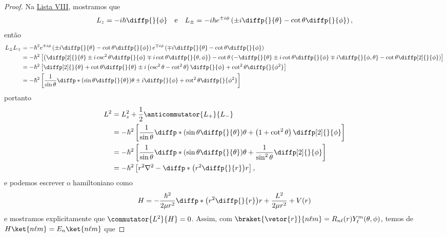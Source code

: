 \begin{proof}
    Na \href{https://github.com/louisradial/4302403-mecanica-quantica-i/releases/tag/lista8}{Lista VIII}, mostramos que
    \begin{equation*}
        L_z = -i\hbar \diffp{}{\phi}\quad\text{e}\quad L_{\pm} = -i\hbar e^{\pm i \phi}\left(\pm i \diffp{}{\theta} - \cot\theta \diffp{}{\phi}\right),
    \end{equation*}
    então
    \begin{align*}
        L_\pm L_\mp &= -\hbar^2 e^{\pm i \phi}\left(\pm i \diffp{}{\theta} - \cot\theta \diffp{}{\phi}\right)e^{\mp i \phi}\left(\mp i \diffp{}{\theta} - \cot\theta \diffp{}{\phi}\right)\\
                    &= -\hbar^2 \left[\left(\diffp[2]{}{\theta} \pm i\csc^2\theta \diffp{}{\phi} \mp i \cot\theta \diffp{}{\theta,\phi}\right) - \cot\theta \left(- \diffp{}{\theta} \pm i \cot\theta \diffp{}{\phi} \mp i \diffp{}{\phi, \theta} - \cot\theta \diffp[2]{}{\phi}\right)\right]\\
                    &= -\hbar^2 \left[\diffp[2]{}{\theta} + \cot\theta \diffp{}{\theta} \pm i \left(\csc^2\theta - \cot^2\theta\right)\diffp{}{\phi} + \cot^2\theta \diffp{}{\phi^2}\right]\\
                    &= -\hbar^2\left[\frac{1}{\sin\theta}\diffp*{\left(\sin\theta\diffp{}{\theta}\right)}{\theta}  \pm i \diffp{}{\phi} + \cot^2\theta \diffp{}{\phi^2}\right]
    \end{align*}
    portanto
    \begin{align*}
        L^2 &= L_z^2 + \frac12 \anticommutator{L_+}{L_-}\\
            &= -\hbar^2 \left[\frac{1}{\sin\theta}\diffp*{\left(\sin\theta \diffp{}{\theta}\right)}{\theta} + \left(1 + \cot^2\theta\right)\diffp[2]{}{\phi}\right]\\
            &= - \hbar^2\left[\frac{1}{\sin\theta}\diffp*{\left(\sin\theta \diffp{}{\theta}\right)}{\theta} + \frac{1}{\sin^2\theta}\diffp[2]{}{\phi}\right]\\
            &= -\hbar^2\left[r^2\nabla^2 - \diffp*{\left(r^2 \diffp{}{r}\right)}{r}\right],
    \end{align*}
    e podemos escrever o hamiltoniano como
    \begin{equation*}
        H = -\frac{\hbar^2}{2\mu r^2}\diffp*{\left(r^2 \diffp{}{r}\right)}{r} + \frac{L^2}{2\mu r^2} + V(r)
    \end{equation*}
    e mostramos explicitamente que \(\commutator{L^2}{H} = 0\). Assim, com \(\braket{\vetor{r}}{n\ell m} = R_{n\ell}(r) Y_\ell^m(\theta,\phi)\), temos de \(H\ket{n\ell m} = E_n \ket{n\ell m}\) que

\end{proof}
